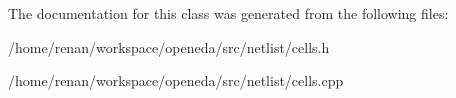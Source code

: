 The documentation for this class was generated from the following files\-:\begin{DoxyCompactItemize}
\item 
/home/renan/workspace/openeda/src/netlist/cells.\-h\item 
/home/renan/workspace/openeda/src/netlist/cells.\-cpp\end{DoxyCompactItemize}
